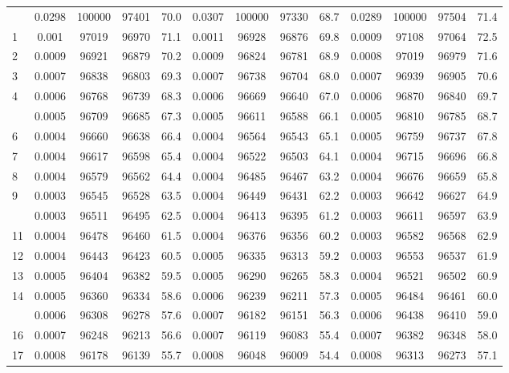 \documentclass[
  14pt,
]{article}
\begin{document}
\begin{longtable}[t]{lcccccccccccc}
\endfoot
\bottomrule
\endlastfoot
0 & 0.0298 & 100000 & 97401 & 70.0 & 0.0307 & 100000 & 97330 & 68.7 & 0.0289 & 100000 & 97504 & 71.4\\
1 & 0.001 & 97019 & 96970 & 71.1 & 0.0011 & 96928 & 96876 & 69.8 & 0.0009 & 97108 & 97064 & 72.5\\
2 & 0.0009 & 96921 & 96879 & 70.2 & 0.0009 & 96824 & 96781 & 68.9 & 0.0008 & 97019 & 96979 & 71.6\\
3 & 0.0007 & 96838 & 96803 & 69.3 & 0.0007 & 96738 & 96704 & 68.0 & 0.0007 & 96939 & 96905 & 70.6\\
4 & 0.0006 & 96768 & 96739 & 68.3 & 0.0006 & 96669 & 96640 & 67.0 & 0.0006 & 96870 & 96840 & 69.7\\
\addlinespace
5 & 0.0005 & 96709 & 96685 & 67.3 & 0.0005 & 96611 & 96588 & 66.1 & 0.0005 & 96810 & 96785 & 68.7\\
6 & 0.0004 & 96660 & 96638 & 66.4 & 0.0004 & 96564 & 96543 & 65.1 & 0.0005 & 96759 & 96737 & 67.8\\
7 & 0.0004 & 96617 & 96598 & 65.4 & 0.0004 & 96522 & 96503 & 64.1 & 0.0004 & 96715 & 96696 & 66.8\\
8 & 0.0004 & 96579 & 96562 & 64.4 & 0.0004 & 96485 & 96467 & 63.2 & 0.0004 & 96676 & 96659 & 65.8\\
9 & 0.0003 & 96545 & 96528 & 63.5 & 0.0004 & 96449 & 96431 & 62.2 & 0.0003 & 96642 & 96627 & 64.9\\
\addlinespace
10 & 0.0003 & 96511 & 96495 & 62.5 & 0.0004 & 96413 & 96395 & 61.2 & 0.0003 & 96611 & 96597 & 63.9\\
11 & 0.0004 & 96478 & 96460 & 61.5 & 0.0004 & 96376 & 96356 & 60.2 & 0.0003 & 96582 & 96568 & 62.9\\
12 & 0.0004 & 96443 & 96423 & 60.5 & 0.0005 & 96335 & 96313 & 59.2 & 0.0003 & 96553 & 96537 & 61.9\\
13 & 0.0005 & 96404 & 96382 & 59.5 & 0.0005 & 96290 & 96265 & 58.3 & 0.0004 & 96521 & 96502 & 60.9\\
14 & 0.0005 & 96360 & 96334 & 58.6 & 0.0006 & 96239 & 96211 & 57.3 & 0.0005 & 96484 & 96461 & 60.0\\
\addlinespace
15 & 0.0006 & 96308 & 96278 & 57.6 & 0.0007 & 96182 & 96151 & 56.3 & 0.0006 & 96438 & 96410 & 59.0\\
16 & 0.0007 & 96248 & 96213 & 56.6 & 0.0007 & 96119 & 96083 & 55.4 & 0.0007 & 96382 & 96348 & 58.0\\
17 & 0.0008 & 96178 & 96139 & 55.7 & 0.0008 & 96048 & 96009 & 54.4 & 0.0008 & 96313 & 96273 & 57.1\\

\end{longtable}
\end{document}
